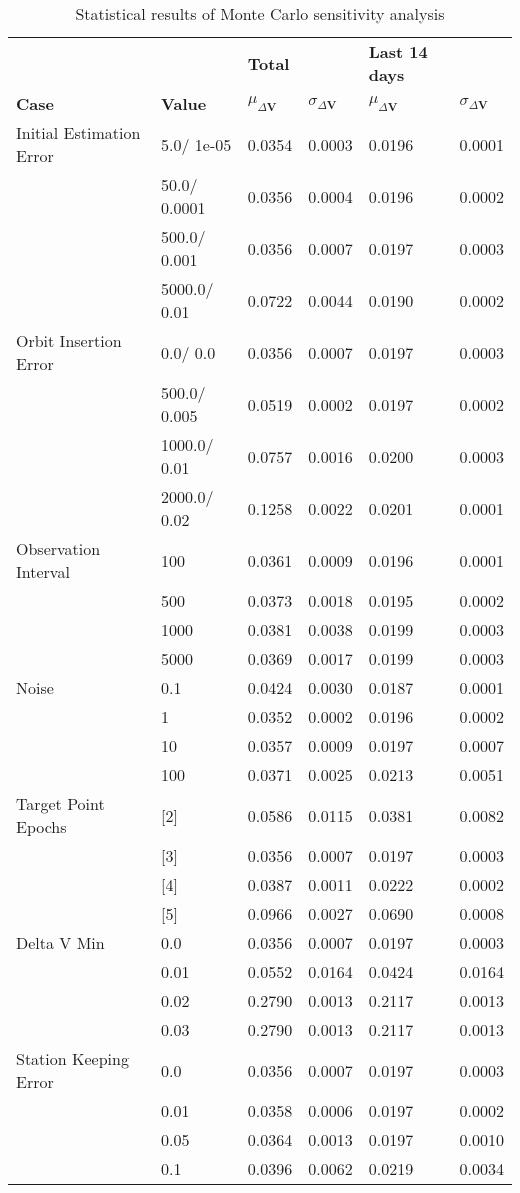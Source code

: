 \begin{table}[h!]
\centering
\begin{tabular}{llllll}
 &  & \cellcolor[HTML]{EFEFEF}\textbf{Total} &  & \cellcolor[HTML]{EFEFEF}\textbf{Last 14 days} &  \\
\rowcolor[HTML]{EFEFEF} 
\textbf{Case} & \textbf{Value} & \textbf{$\mu_{\Delta \boldsymbol{V}}$} & \textbf{$\sigma_{\Delta \boldsymbol{V}}$} & \textbf{$\mu_{\Delta \boldsymbol{V}}$} & \textbf{$\sigma_{\Delta \boldsymbol{V}}$} \\ 
Initial Estimation Error & 5.0/
1e-05 & 0.0354 & 0.0003 & 0.0196 & 0.0001 \\ 
 & 50.0/
0.0001 & 0.0356 & 0.0004 & 0.0196 & 0.0002 \\ 
 & 500.0/
0.001 & 0.0356 & 0.0007 & 0.0197 & 0.0003 \\ 
 & 5000.0/
0.01 & 0.0722 & 0.0044 & 0.0190 & 0.0002 \\ 
Orbit Insertion Error & 0.0/
0.0 & 0.0356 & 0.0007 & 0.0197 & 0.0003 \\ 
 & 500.0/
0.005 & 0.0519 & 0.0002 & 0.0197 & 0.0002 \\ 
 & 1000.0/
0.01 & 0.0757 & 0.0016 & 0.0200 & 0.0003 \\ 
 & 2000.0/
0.02 & 0.1258 & 0.0022 & 0.0201 & 0.0001 \\ 
Observation Interval & 100 & 0.0361 & 0.0009 & 0.0196 & 0.0001 \\ 
 & 500 & 0.0373 & 0.0018 & 0.0195 & 0.0002 \\ 
 & 1000 & 0.0381 & 0.0038 & 0.0199 & 0.0003 \\ 
 & 5000 & 0.0369 & 0.0017 & 0.0199 & 0.0003 \\ 
Noise & 0.1 & 0.0424 & 0.0030 & 0.0187 & 0.0001 \\ 
 & 1 & 0.0352 & 0.0002 & 0.0196 & 0.0002 \\ 
 & 10 & 0.0357 & 0.0009 & 0.0197 & 0.0007 \\ 
 & 100 & 0.0371 & 0.0025 & 0.0213 & 0.0051 \\ 
Target Point Epochs & [2] & 0.0586 & 0.0115 & 0.0381 & 0.0082 \\ 
 & [3] & 0.0356 & 0.0007 & 0.0197 & 0.0003 \\ 
 & [4] & 0.0387 & 0.0011 & 0.0222 & 0.0002 \\ 
 & [5] & 0.0966 & 0.0027 & 0.0690 & 0.0008 \\ 
Delta V Min & 0.0 & 0.0356 & 0.0007 & 0.0197 & 0.0003 \\ 
 & 0.01 & 0.0552 & 0.0164 & 0.0424 & 0.0164 \\ 
 & 0.02 & 0.2790 & 0.0013 & 0.2117 & 0.0013 \\ 
 & 0.03 & 0.2790 & 0.0013 & 0.2117 & 0.0013 \\ 
Station Keeping Error & 0.0 & 0.0356 & 0.0007 & 0.0197 & 0.0003 \\ 
 & 0.01 & 0.0358 & 0.0006 & 0.0197 & 0.0002 \\ 
 & 0.05 & 0.0364 & 0.0013 & 0.0197 & 0.0010 \\ 
 & 0.1 & 0.0396 & 0.0062 & 0.0219 & 0.0034 \\ 
\end{tabular}
\caption{Statistical results of Monte Carlo sensitivity analysis}
\label{tab:SensitivityAnalysis}
\end{table}